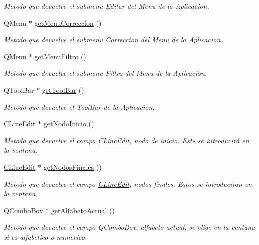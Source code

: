 \begin{DoxyCompactItemize}
\begin{DoxyCompactList}\small\item\em Metodo que devuelve el submenu Editar del Menu de la Aplicacion. \end{DoxyCompactList}\item 
Q\+Menu $\ast$ \hyperlink{classCAplicacion_a67443b72909b19dfae9f2d322b2eaa7e}{get\+Menu\+Correccion} ()
\begin{DoxyCompactList}\small\item\em Metodo que devuelve el submenu Correccion del Menu de la Aplicacion. \end{DoxyCompactList}\item 
Q\+Menu $\ast$ \hyperlink{classCAplicacion_aa234ca246ac29bfca8c8f8fc39e07206}{get\+Menu\+Filtro} ()
\begin{DoxyCompactList}\small\item\em Metodo que devuelve el submenu Filtro del Menu de la Aplicacion. \end{DoxyCompactList}\item 
Q\+Tool\+Bar $\ast$ \hyperlink{classCAplicacion_a7cc8e6f81a363c5fec003c811e7f2618}{get\+Tool\+Bar} ()
\begin{DoxyCompactList}\small\item\em Metodo que devuelve el Tool\+Bar de la Aplicacion. \end{DoxyCompactList}\item 
\hyperlink{classCLineEdit}{C\+Line\+Edit} $\ast$ \hyperlink{classCAplicacion_af85f5505cf86de4ea460765b0032fa4f}{get\+Nodo\+Inicio} ()
\begin{DoxyCompactList}\small\item\em Metodo que devuelve el campo \hyperlink{classCLineEdit}{C\+Line\+Edit}, nodo de inicio. Este se introducirá en la ventana. \end{DoxyCompactList}\item 
\hyperlink{classCLineEdit}{C\+Line\+Edit} $\ast$ \hyperlink{classCAplicacion_a17a77e146a8a785cbf92158c9b7240df}{get\+Nodos\+Finales} ()
\begin{DoxyCompactList}\small\item\em Metodo que devuelve el campo \hyperlink{classCLineEdit}{C\+Line\+Edit}, nodos finales. Estos se introduciran en la ventana. \end{DoxyCompactList}\item 
Q\+Combo\+Box $\ast$ \hyperlink{classCAplicacion_a41b85abfacd73ff66a345d08b934bc45}{get\+Alfabeto\+Actual} ()
\begin{DoxyCompactList}\small\item\em Metodo que devuelve el campo Q\+Combo\+Box, alfabeto actual, se elige en la ventana si es alfabetico o numerico. \end{DoxyCompactList}\item 

\end{DoxyCompactItemize}
